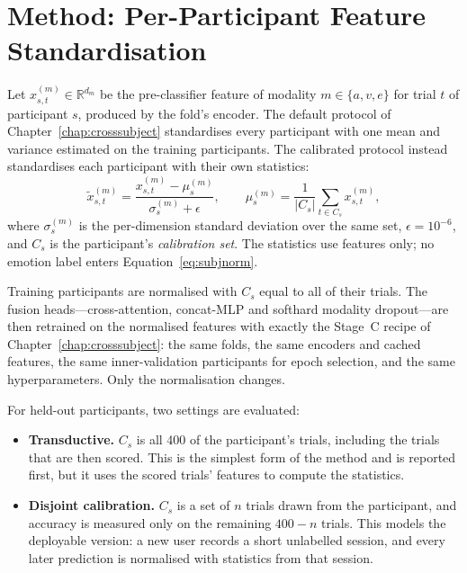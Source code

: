 \section{Method: Per-Participant Feature Standardisation}
\label{sec:cal_method}

Let $x^{(m)}_{s,t} \in \mathbb{R}^{d_m}$ be the pre-classifier feature of modality
$m \in \{a, v, e\}$ for trial $t$ of participant $s$, produced by the fold's encoder.
The default protocol of Chapter~\ref{chap:crosssubject} standardises every
participant with one mean and variance estimated on the training participants. The
calibrated protocol instead standardises each participant with their own statistics:
\begin{equation}
  \tilde{x}^{(m)}_{s,t} = \frac{x^{(m)}_{s,t} - \mu^{(m)}_{s}}{\sigma^{(m)}_{s} + \epsilon},
  \qquad
  \mu^{(m)}_{s} = \frac{1}{|C_s|}\sum_{t \in C_s} x^{(m)}_{s,t},
  \label{eq:subjnorm}
\end{equation}
where $\sigma^{(m)}_{s}$ is the per-dimension standard deviation over the same set,
$\epsilon = 10^{-6}$, and $C_s$ is the participant's \emph{calibration set}. The
statistics use features only; no emotion label enters Equation~\ref{eq:subjnorm}.

Training participants are normalised with $C_s$ equal to all of their trials. The
fusion heads---cross-attention, concat-MLP and softhard modality dropout---are then
retrained on the normalised features with exactly the Stage~C recipe of
Chapter~\ref{chap:crosssubject}: the same folds, the same encoders and cached
features, the same inner-validation participants for epoch selection, and the same
hyperparameters. Only the normalisation changes.

For held-out participants, two settings are evaluated:
\begin{itemize}
  \item \textbf{Transductive.} $C_s$ is all 400 of the participant's trials,
  including the trials that are then scored. This is the simplest form of the method
  and is reported first, but it uses the scored trials' features to compute the
  statistics.
  \item \textbf{Disjoint calibration.} $C_s$ is a set of $n$ trials drawn from the
  participant, and accuracy is measured only on the remaining $400 - n$ trials. This
  models the deployable version: a new user records a short unlabelled session, and
  every later prediction is normalised with statistics from that session.
\end{itemize}

